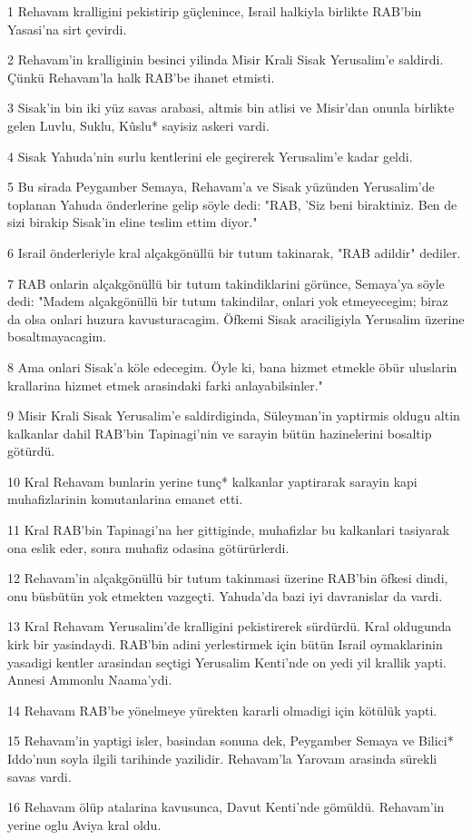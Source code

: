 \par 1 Rehavam kralligini pekistirip güçlenince, Israil halkiyla birlikte RAB'bin Yasasi'na sirt çevirdi.
\par 2 Rehavam'in kralliginin besinci yilinda Misir Krali Sisak Yerusalim'e saldirdi. Çünkü Rehavam'la halk RAB'be ihanet etmisti.
\par 3 Sisak'in bin iki yüz savas arabasi, altmis bin atlisi ve Misir'dan onunla birlikte gelen Luvlu, Suklu, Kûslu* sayisiz askeri vardi.
\par 4 Sisak Yahuda'nin surlu kentlerini ele geçirerek Yerusalim'e kadar geldi.
\par 5 Bu sirada Peygamber Semaya, Rehavam'a ve Sisak yüzünden Yerusalim'de toplanan Yahuda önderlerine gelip söyle dedi: "RAB, 'Siz beni biraktiniz. Ben de sizi birakip Sisak'in eline teslim ettim diyor."
\par 6 Israil önderleriyle kral alçakgönüllü bir tutum takinarak, "RAB adildir" dediler.
\par 7 RAB onlarin alçakgönüllü bir tutum takindiklarini görünce, Semaya'ya söyle dedi: "Madem alçakgönüllü bir tutum takindilar, onlari yok etmeyecegim; biraz da olsa onlari huzura kavusturacagim. Öfkemi Sisak araciligiyla Yerusalim üzerine bosaltmayacagim.
\par 8 Ama onlari Sisak'a köle edecegim. Öyle ki, bana hizmet etmekle öbür uluslarin krallarina hizmet etmek arasindaki farki anlayabilsinler."
\par 9 Misir Krali Sisak Yerusalim'e saldirdiginda, Süleyman'in yaptirmis oldugu altin kalkanlar dahil RAB'bin Tapinagi'nin ve sarayin bütün hazinelerini bosaltip götürdü.
\par 10 Kral Rehavam bunlarin yerine tunç* kalkanlar yaptirarak sarayin kapi muhafizlarinin komutanlarina emanet etti.
\par 11 Kral RAB'bin Tapinagi'na her gittiginde, muhafizlar bu kalkanlari tasiyarak ona eslik eder, sonra muhafiz odasina götürürlerdi.
\par 12 Rehavam'in alçakgönüllü bir tutum takinmasi üzerine RAB'bin öfkesi dindi, onu büsbütün yok etmekten vazgeçti. Yahuda'da bazi iyi davranislar da vardi.
\par 13 Kral Rehavam Yerusalim'de kralligini pekistirerek sürdürdü. Kral oldugunda kirk bir yasindaydi. RAB'bin adini yerlestirmek için bütün Israil oymaklarinin yasadigi kentler arasindan seçtigi Yerusalim Kenti'nde on yedi yil krallik yapti. Annesi Ammonlu Naama'ydi.
\par 14 Rehavam RAB'be yönelmeye yürekten kararli olmadigi için kötülük yapti.
\par 15 Rehavam'in yaptigi isler, basindan sonuna dek, Peygamber Semaya ve Bilici* Iddo'nun soyla ilgili tarihinde yazilidir. Rehavam'la Yarovam arasinda sürekli savas vardi.
\par 16 Rehavam ölüp atalarina kavusunca, Davut Kenti'nde gömüldü. Rehavam'in yerine oglu Aviya kral oldu.

